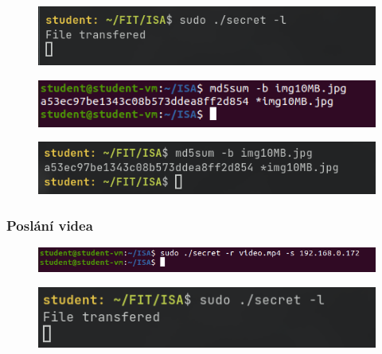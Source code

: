 \documentclass[11pt, a4paper]{article}
\begin{document}
\begin{flushleft}
  \begin{figure}[H]
    \centering
    \includegraphics[scale=0.91, keepaspectratio]{img/ub_send_101.png}
    \label{fig:txt}
 \end{figure}
 
 \begin{figure}[H]
    \centering
    \includegraphics[scale=0.98, keepaspectratio]{img/ub_cmp_10.png}
    \label{fig:txt}
 \end{figure}
 
  \begin{figure}[H]
    \centering
    \includegraphics[scale=0.86, keepaspectratio]{img/ub_cmp_101.png}
    \label{fig:txt}
 \end{figure}

\subsubsection{Poslání videa}

\begin{figure}[H]
    \centering
    \includegraphics[scale=0.67, keepaspectratio]{img/ub_send_vid.png}
    \label{fig:txt}
 \end{figure}
 
  \begin{figure}[H]
    \centering
    \includegraphics[scale=1.02, keepaspectratio]{img/ub_send_vid1.png}
    \label{fig:txt}
 \end{figure}
 

\end{flushleft}
\end{document}
